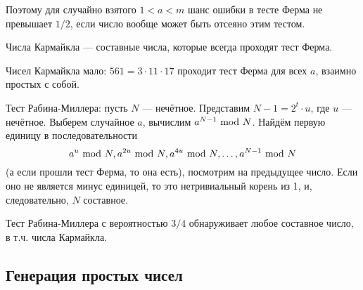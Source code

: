 Поэтому для случайно взятого $1 < a < m$
шанс ошибки в тесте Ферма не превышает $1/2$,
если число вообще может быть отсеяно этим тестом.

\begin{definition}
    Числа Кармайкла --- составные числа,
    которые всегда проходят тест Ферма.
\end{definition}
Чисел Кармайкла мало: $561 = 3 \cdot 11 \cdot 17$
проходит тест Ферма для всех $a$, взаимно простых с собой.

Тест Рабина-Миллера:
пусть $N$ --- нечётное.
Представим $N - 1 = 2^t \cdot u$,
где $u$ --- нечётное.
Выберем случайное $a$,
вычислим $a^{N - 1} ~\text{mod}~ N$.
Найдём первую единицу в последовательности
\[
    a^u ~\text{mod}~ N,
    a^{2u} ~\text{mod}~ N,
    a^{4u} ~\text{mod}~ N, \ldots,
    a^{N - 1} ~\text{mod}~ N
\]
(а если прошли тест Ферма, то она есть),
посмотрим на предыдущее число.
Если оно не является минус единицей,
то это нетривиальный корень из 1,
и, следовательно, $N$ составное.

Тест Рабина-Миллера с вероятностью $3/4$ обнаруживает
любое составное число, в т.ч. числа Кармайкла.

\subsection{Генерация простых чисел}
